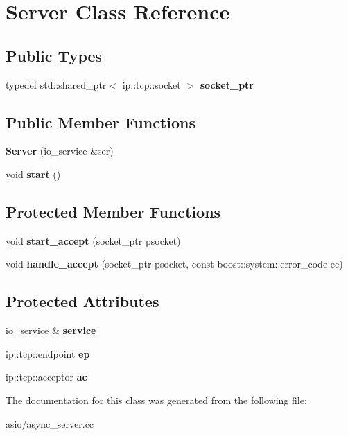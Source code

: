 \hypertarget{classServer}{}\section{Server Class Reference}
\label{classServer}
\subsection*{Public Types}
\begin{DoxyCompactItemize}
\item 
\mbox{\label{classServer_a1704a3918f1a1d44f4f7ad8223ddfdc8}} 
typedef std\+::shared\+\_\+ptr$<$ ip\+::tcp\+::socket $>$ {\bfseries socket\+\_\+ptr}
\end{DoxyCompactItemize}
\subsection*{Public Member Functions}
\begin{DoxyCompactItemize}
\item 
\mbox{\label{classServer_a4df8b0535563c8ed3ff6d61b734a1f78}} 
{\bfseries Server} (io\+\_\+service \&ser)
\item 
\mbox{\label{classServer_a7eac07d2582fa01c2671362efa955b31}} 
void {\bfseries start} ()
\end{DoxyCompactItemize}
\subsection*{Protected Member Functions}
\begin{DoxyCompactItemize}
\item 
\mbox{\label{classServer_afc6b790ef64c0ce37330a7d2d1d6ccd5}} 
void {\bfseries start\+\_\+accept} (socket\+\_\+ptr psocket)
\item 
\mbox{\label{classServer_a3468a5afb9b04ac93f4c157f74d12640}} 
void {\bfseries handle\+\_\+accept} (socket\+\_\+ptr psocket, const boost\+::system\+::error\+\_\+code ec)
\end{DoxyCompactItemize}
\subsection*{Protected Attributes}
\begin{DoxyCompactItemize}
\item 
\mbox{\label{classServer_ae4722c2f98948cc7c2c672b32d3c553e}} 
io\+\_\+service \& {\bfseries service}
\item 
\mbox{\label{classServer_ae847c95edf67fb1625f1ed7b2936fc6e}} 
ip\+::tcp\+::endpoint {\bfseries ep}
\item 
\mbox{\label{classServer_a3b3f2b34d9778274dde9c4cbf2d2d9f4}} 
ip\+::tcp\+::acceptor {\bfseries ac}
\end{DoxyCompactItemize}


The documentation for this class was generated from the following file\+:\begin{DoxyCompactItemize}
\item 
asio/async\+\_\+server.\+cc\end{DoxyCompactItemize}
